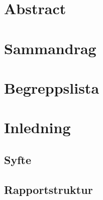 \documentclass[12pt,a4paper,twoside,openright]{report}
\begin{document}


\cleardoublepage


\cleardoublepage
{} %
\setcounter{page}{3}

{}
\chapter*{Abstract}


{}
\chapter*{Sammandrag}

\cleardoublepage

\tableofcontents

{}
\chapter*{Begreppslista}



\chapter{Inledning}\label{chap:inledning}

% 
% 
\section{Syfte}\label{sec:syfte}

\section{Rapportstruktur}

\end{document}

